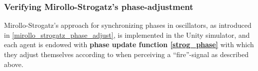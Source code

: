 	
	
		\subsubsection{Verifying Mirollo-Strogatz's phase-adjustment} %
		
		Mirollo-Strogatz's approach for synchronizing phases in oscillators, as introduced in \ref{mirollo_strogatz_phase_adjust}, is implemented in the Unity simulator, and each agent is endowed with \textbf{phase update function \eqref{strog_phase}} with which they adjust themselves according to when perceiving a ``fire''-signal as described above.
		
